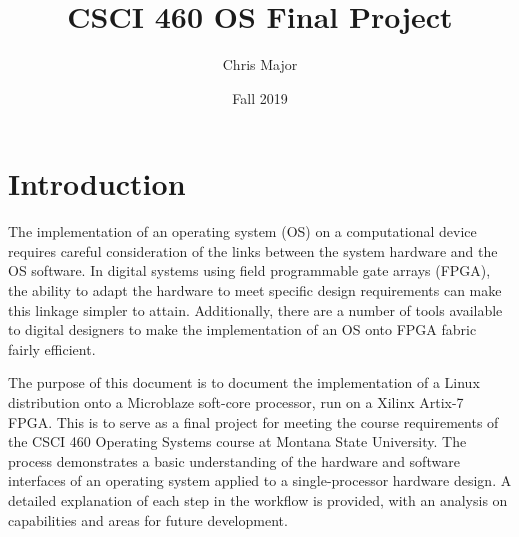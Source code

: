 \documentclass{article}
\title{CSCI 460 OS Final Project}
\author{Chris Major}
\date{Fall 2019}
\begin{document}
\maketitle

\tableofcontents

\section{Introduction}
The implementation of an operating system (OS) on a computational device requires careful consideration of the links between the system hardware and the OS software. In digital systems using field programmable gate arrays (FPGA), the ability to adapt the hardware to meet specific design requirements can make this linkage simpler to attain. Additionally, there are a number of tools available to digital designers to make the implementation of an OS onto FPGA fabric fairly efficient.\par
The purpose of this document is to document the implementation of a Linux distribution onto a Microblaze soft-core processor, run on a Xilinx Artix-7 FPGA. This is to serve as a final project for meeting the course requirements of the CSCI 460 Operating Systems course at Montana State University. The process demonstrates a basic understanding of the hardware and software interfaces of an operating system applied to a single-processor hardware design. A detailed explanation of each step in the workflow is provided, with an analysis on capabilities and areas for future development.\par

\end{document}
